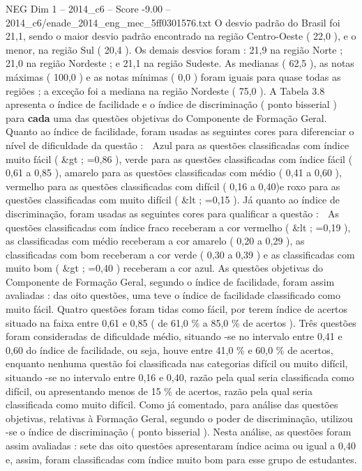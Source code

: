 \begin{textsample}{NEG Dim 1 – 2014\_c6 – Score -9.00 – 2014\_c6/enade\_2014\_eng\_mec\_5ff0301576.txt}
O desvio padrão do Brasil foi 21,1, sendo o maior desvio padrão encontrado na região Centro-Oeste ( 22,0 ), e o menor, na região Sul ( 20,4 ).
Os demais desvios foram : 21,9 na região Norte ; 21,0 na região Nordeste ; e 21,1 na região Sudeste.
As medianas ( 62,5 ), as notas máximas ( 100,0 ) e as notas mínimas ( 0,0 ) foram iguais para quase todas as regiões ; a exceção foi a mediana na região Nordeste ( 75,0 ).
A Tabela 3.8 apresenta o índice de facilidade e o índice de discriminação ( ponto bisserial ) para \textbf{cada} uma das questões objetivas do Componente de Formação Geral.
Quanto ao índice de facilidade, foram usadas as seguintes cores para diferenciar o nível de dificuldade da questão :  Azul para as questões classificadas com índice muito fácil ( \&gt ; =0,86 ), verde para as questões classificadas com índice fácil ( 0,61 a 0,85 ), amarelo para as questões classificadas com médio ( 0,41 a 0,60 ), vermelho para as questões classificadas com difícil ( 0,16 a 0,40)e roxo para as questões classificadas com muito difícil ( \&lt ; =0,15 ).
Já quanto ao índice de discriminação, foram usadas as seguintes cores para qualificar a questão :  As questões classificadas com índice fraco receberam a cor vermelho ( \&lt ; =0,19 ), as classificadas com médio receberam a cor amarelo ( 0,20 a 0,29 ), as classificadas com bom receberam a cor verde ( 0,30 a 0,39 ) e as classificadas com muito bom ( \&gt ; =0,40 ) receberam a cor azul.
As questões objetivas do Componente de Formação Geral, segundo o índice de facilidade, foram assim avaliadas : das oito questões, uma teve o índice de facilidade classificado como muito fácil.
Quatro questões foram tidas como fácil, por terem índice de acertos situado na faixa entre 0,61 e 0,85 ( de 61,0 \% a 85,0 \% de acertos ).
Três questões foram consideradas de dificuldade médio, situando -se no intervalo entre 0,41 e 0,60 do índice de facilidade, ou seja, houve entre 41,0 \% e 60,0 \% de acertos, enquanto nenhuma questão foi classificada nas categorias difícil ou muito difícil, situando -se no intervalo entre 0,16 e 0,40, razão pela qual seria classificada como difícil, ou apresentando menos de 15 \% de acertos, razão pela qual seria classificada como muito difícil.
Como já comentado, para análise das questões objetivas, relativas à Formação Geral, segundo o poder de discriminação, utilizou -se o índice de discriminação ( ponto bisserial ).
Nesta análise, as questões foram assim avaliadas : sete das oito questões apresentaram índice acima ou igual a 0,40 e, assim, foram classificadas com índice muito bom para esse grupo de estudantes.

\end{textsample}
